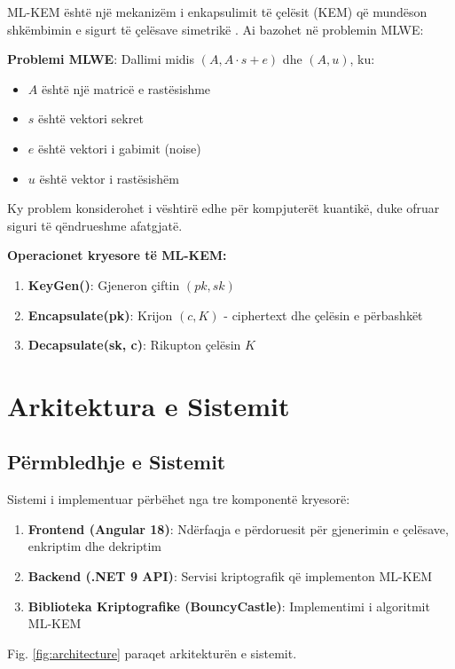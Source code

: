 \documentclass[conference]{IEEEtran}
\begin{document}
ML-KEM është një mekanizëm i enkapsulimit të çelësit (KEM) që mundëson shkëmbimin e sigurt të çelësave simetrikë \cite{bos2018}. Ai bazohet në problemin MLWE:

\textbf{Problemi MLWE}: Dallimi midis $(A, A \cdot s + e)$ dhe $(A, u)$, ku:
\begin{itemize}
\item $A$ është një matricë e rastësishme
\item $s$ është vektori sekret
\item $e$ është vektori i gabimit (noise)
\item $u$ është vektor i rastësishëm
\end{itemize}

Ky problem konsiderohet i vështirë edhe për kompjuterët kuantikë, duke ofruar siguri të qëndrueshme afatgjatë.

\textbf{Operacionet kryesore të ML-KEM:}
\begin{enumerate}
\item \textbf{KeyGen()}: Gjeneron çiftin $(pk, sk)$
\item \textbf{Encapsulate(pk)}: Krijon $(c, K)$ - ciphertext dhe çelësin e përbashkët
\item \textbf{Decapsulate(sk, c)}: Rikupton çelësin $K$
\end{enumerate}

\section{Arkitektura e Sistemit}

\subsection{Përmbledhje e Sistemit}

Sistemi i implementuar përbëhet nga tre komponentë kryesorë:

\begin{enumerate}
\item \textbf{Frontend (Angular 18)}: Ndërfaqja e përdoruesit për gjenerimin e çelësave, enkriptim dhe dekriptim
\item \textbf{Backend (.NET 9 API)}: Servisi kriptografik që implementon ML-KEM
\item \textbf{Biblioteka Kriptografike (BouncyCastle)}: Implementimi i algoritmit ML-KEM
\end{enumerate}

Fig. \ref{fig:architecture} paraqet arkitekturën e sistemit.
\end{document}
